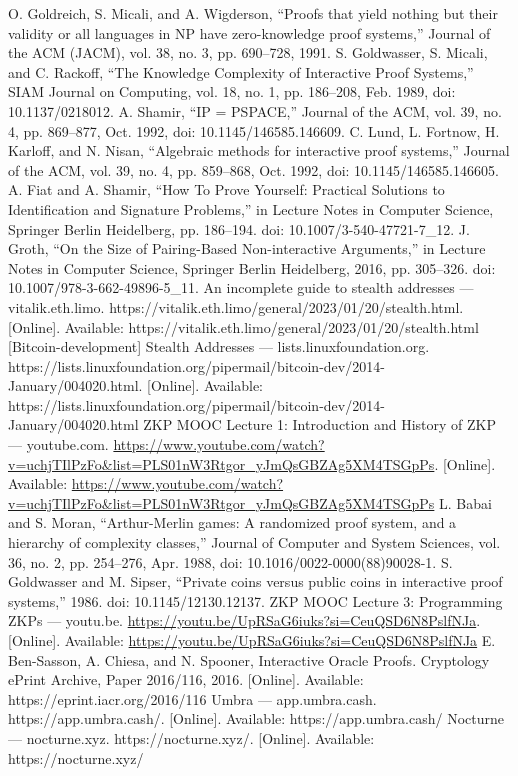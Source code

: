 \documentclass[conference,comsoc,10pt]{IEEEtran}
\begin{document}
\begin{thebibliography}{00}
     O. Goldreich, S. Micali, and A. Wigderson, “Proofs that yield nothing but their validity or all languages in NP have zero-knowledge proof systems,” Journal of the ACM (JACM), vol. 38, no. 3, pp. 690–728, 1991.
     S. Goldwasser, S. Micali, and C. Rackoff, “The Knowledge Complexity of Interactive Proof Systems,” SIAM Journal on Computing, vol. 18, no. 1, pp. 186–208, Feb. 1989, doi: 10.1137/0218012.
     A. Shamir, “IP = PSPACE,” Journal of the ACM, vol. 39, no. 4, pp. 869–877, Oct. 1992, doi: 10.1145/146585.146609.
     C. Lund, L. Fortnow, H. Karloff, and N. Nisan, “Algebraic methods for interactive proof systems,” Journal of the ACM, vol. 39, no. 4, pp. 859–868, Oct. 1992, doi: 10.1145/146585.146605.
     A. Fiat and A. Shamir, “How To Prove Yourself: Practical Solutions to Identification and Signature Problems,” in Lecture Notes in Computer Science, Springer Berlin Heidelberg, pp. 186–194. doi: 10.1007/3-540-47721-7\_12.
     J. Groth, “On the Size of Pairing-Based Non-interactive Arguments,” in Lecture Notes in Computer Science, Springer Berlin Heidelberg, 2016, pp. 305–326. doi: 10.1007/978-3-662-49896-5\_11.
     An incomplete guide to stealth addresses — vitalik.eth.limo. https://vitalik.eth.limo/general/2023/01/20/stealth.html. [Online]. Available: https://vitalik.eth.limo/general/2023/01/20/stealth.html
     [Bitcoin-development] Stealth Addresses — lists.linuxfoundation.org. https://lists.linuxfoundation.org/pipermail/bitcoin-dev/2014-January/004020.html. [Online]. Available: https://lists.linuxfoundation.org/pipermail/bitcoin-dev/2014-January/004020.html
     ZKP MOOC Lecture 1: Introduction and History of ZKP — youtube.com. \url{https://www.youtube.com/watch?v=uchjTIlPzFo&list=PLS01nW3Rtgor_yJmQsGBZAg5XM4TSGpPs}. [Online]. Available: \url{https://www.youtube.com/watch?v=uchjTIlPzFo&list=PLS01nW3Rtgor_yJmQsGBZAg5XM4TSGpPs}
     L. Babai and S. Moran, “Arthur-Merlin games: A randomized proof system, and a hierarchy of complexity classes,” Journal of Computer and System Sciences, vol. 36, no. 2, pp. 254–276, Apr. 1988, doi: 10.1016/0022-0000(88)90028-1.
     S. Goldwasser and M. Sipser, “Private coins versus public coins in interactive proof systems,” 1986. doi: 10.1145/12130.12137.
     ZKP MOOC Lecture 3: Programming ZKPs — youtu.be. \url{https://youtu.be/UpRSaG6iuks?si=CeuQSD6N8PslfNJa}. [Online]. Available: \url{https://youtu.be/UpRSaG6iuks?si=CeuQSD6N8PslfNJa}
     E. Ben-Sasson, A. Chiesa, and N. Spooner, Interactive Oracle Proofs. Cryptology ePrint Archive, Paper 2016/116, 2016. [Online]. Available: https://eprint.iacr.org/2016/116
     Umbra — app.umbra.cash. https://app.umbra.cash/. [Online]. Available: https://app.umbra.cash/
     Nocturne — nocturne.xyz. https://nocturne.xyz/. [Online]. Available: https://nocturne.xyz/

\end{thebibliography}
\end{document}
